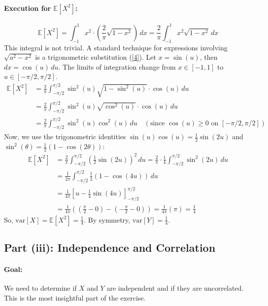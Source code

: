 \documentclass[11pt,a4paper]{article}
\theoremstyle{mystyle}
\begin{document}
\paragraph{Execution for $\mathbb{E}[X^2]$:}
\[
\mathbb{E}[X^2] = \int_{-1}^{1} x^2 \cdot \left( \frac{2}{\pi} \sqrt{1-x^2} \right) \, dx = \frac{2}{\pi} \int_{-1}^{1} x^2 \sqrt{1-x^2} \, dx
\]
This integral is not trivial. A standard technique for expressions involving $\sqrt{a^2-x^2}$ is a trigonometric substitution (\hyperlink{note4}{[4]}). Let $x = \sin(u)$, then $dx = \cos(u) \, du$. The limits of integration change from $x \in [-1, 1]$ to $u \in [-\pi/2, \pi/2]$.
\begin{align*}
\mathbb{E}[X^2] &= \frac{2}{\pi} \int_{-\pi/2}^{\pi/2} \sin^2(u) \sqrt{1-\sin^2(u)} \cdot \cos(u) \, du \\
&= \frac{2}{\pi} \int_{-\pi/2}^{\pi/2} \sin^2(u) \sqrt{\cos^2(u)} \cdot \cos(u) \, du \\
&= \frac{2}{\pi} \int_{-\pi/2}^{\pi/2} \sin^2(u) \cos^2(u) \, du \quad (\text{since } \cos(u) \geq 0 \text{ on } [-\pi/2, \pi/2])
\end{align*}
Now, we use the trigonometric identities $\sin(u)\cos(u) = \frac{1}{2}\sin(2u)$ and $\sin^2(\theta) = \frac{1}{2}(1-\cos(2\theta))$:
\begin{align*}
\mathbb{E}[X^2] &= \frac{2}{\pi} \int_{-\pi/2}^{\pi/2} \left(\frac{1}{2}\sin(2u)\right)^2 \, du = \frac{2}{\pi} \cdot \frac{1}{4} \int_{-\pi/2}^{\pi/2} \sin^2(2u) \, du \\
&= \frac{1}{2\pi} \int_{-\pi/2}^{\pi/2} \frac{1}{2}(1 - \cos(4u)) \, du \\
&= \frac{1}{4\pi} \left[ u - \frac{1}{4}\sin(4u) \right]_{-\pi/2}^{\pi/2} \\
&= \frac{1}{4\pi} \left( \left(\frac{\pi}{2} - 0\right) - \left(-\frac{\pi}{2} - 0\right) \right) = \frac{1}{4\pi} (\pi) = \frac{1}{4}
\end{align*}
So, $\text{var}[X] = \mathbb{E}[X^2] = \frac{1}{4}$. By symmetry, $\text{var}[Y] = \frac{1}{4}$.

\subsection{Part (iii): Independence and Correlation}

\paragraph{Goal:} We need to determine if $X$ and $Y$ are independent and if they are uncorrelated. This is the most insightful part of the exercise.
\end{document}
